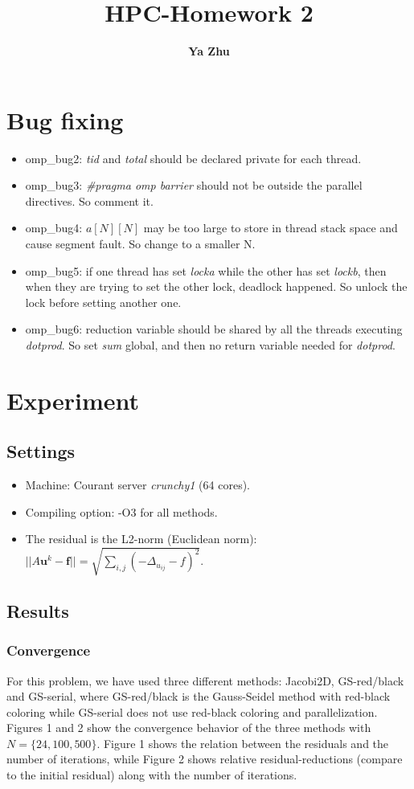 \documentclass[11pt, oneside]{article}   	%
\title{\bf HPC-Homework 2}
\author{\bf \large Ya Zhu}
\date{}							%
\begin{document}
\maketitle 
\section{Bug fixing}
\begin{itemize}
\item omp\_bug2: \emph{tid} and \emph{total} should be declared private for each thread.
\item omp\_bug3: \emph{\#pragma omp barrier} should not be outside the parallel directives. So comment it.
\item omp\_bug4: $a[N][N]$ may be too large to store in thread stack space and cause segment fault. So change to a smaller N.
\item omp\_bug5: if one thread has set \emph{locka} while the other has set \emph{lockb}, then when they are trying to set the other lock, deadlock happened. So unlock the lock before setting another one.
\item omp\_bug6: reduction variable should be shared by all the threads executing \emph{dotprod}. So set \emph{sum} global, and then no return variable needed for \emph{dotprod}.
\end{itemize}
\section{Experiment}
\subsection{Settings}
\begin{itemize}
\item Machine: Courant server \emph{crunchy1} (64 cores).
\item Compiling option: -O3 for all methods.
\item The residual is the L2-norm (Euclidean norm): $||A\boldsymbol{u}^k-\boldsymbol{f}||=\sqrt{\sum_{i,j}({-\Delta_{u_{ij}}-f})^2}$.
\end{itemize}
\subsection{Results}
\subsubsection{Convergence}
For this problem, we have used three different methods: Jacobi2D, GS-red/black and GS-serial, where GS-red/black is the Gauss-Seidel method with red-black coloring while GS-serial does not use red-black coloring and parallelization. Figures 1 and 2 show the convergence behavior of the three methods with $N=\{24,100,500\}$. Figure 1 shows the relation between the residuals and the number of iterations, while Figure 2 shows relative residual-reductions (compare to the initial residual) along with the number of iterations. 
\end{document}

